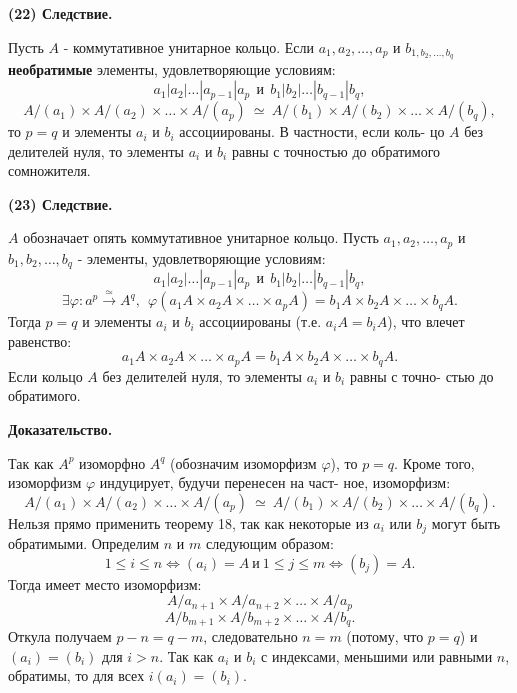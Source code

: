 \documentclass{mai_book}
\begin{document}
	{\bf (22) Следствие.}
	
	Пусть $A$ - коммутативное унитарное кольцо. Если $a_{1}, a_{2}, \ldots, a_{p}$ и\linebreak
	$b_{1, b_{2}, \ldots, b_{q}}$ {\bf необратимые} элементы, удовлетворяющие условиям:
	$$a_{1} |a_{2}|\ldots |a_{p - 1}|a_{p} \ \ \text{и} \ \ b_{1} |b_{2}|\ldots |b_{q - 1}|b_{q},$$
	$$A/(a_{1}) \times A/(a_{2}) \times \ldots \times A/(a_{p}) \ \simeq \ A/(b_{1}) \times A/(b_{2}) \times \ldots \times A/(b_{q}),$$
	то $p = q$ и элементы $a_{i}$ и $b_{i}$ ассоциированы. В частности, если коль-\linebreak
	цо $A$ без делителей нуля, то элементы $a_{i}$ и $b_{i}$ равны с точностью до\linebreak
	обратимого сомножителя.
	
	{\bf (23) Следствие.}
	
	$A$ обозначает опять коммутативное унитарное кольцо. Пусть\linebreak
	$a_{1}, a_{2}, \ldots, a_{p}$ и $b_{1}, b_{2}, \ldots, b_{q}$ - элементы, удовлетворяющие условиям:\linebreak
	$$a_{1} |a_{2}|\ldots |a_{p - 1}|a_{p} \ \ \text{и} \ \ b_{1} |b_{2}|\ldots |b_{q - 1}|b_{q},$$
	$$\exists \varphi : a^{p} \xrightarrow{\simeq} A^{q}, \ \ \varphi (a_{1}A \times a_{2}A \times \ldots \times a_{p}A) = b_{1}A \times b_{2}A \times \ldots \times b_{q}A.$$
	Тогда $p = q$ и элементы $a_{i}$ и $b_{i}$ ассоциированы (т.е. $a_{i}A = b_{i}A$), что\linebreak
	влечет равенство:
	$$a_{1}A \times a_{2}A \times \ldots \times a_{p}A = b_{1}A \times b_{2}A \times \ldots \times b_{q}A.$$
	Если кольцо $A$ без делителей нуля, то элементы $a_{i}$ и $b_{i}$ равны с точно-\linebreak
	стью до обратимого.
	\pagebreak
	
	{\bf Доказательство.}
	
	Так как $A^{p}$ изоморфно $A^{q}$ (обозначим изоморфизм $\varphi$), то $p = q$.\linebreak
	Кроме того, изоморфизм $\varphi$ индуцирует, будучи перенесен на част-\linebreak
	ное, изоморфизм:
	$$A/(a_{1}) \times A/(a_{2}) \times \ldots \times A/(a_{p}) \ \simeq \ A/(b_{1}) \times A/(b_{2}) \times \ldots \times A/(b_{q}).$$
	Нельзя прямо применить теорему 18, так как некоторые из $a_{i}$ или\linebreak
	$b_{j}$ могут быть обратимыми. Определим $n$ и $m$ следующим образом:
	$$1 \leqslant i \leqslant n \Longleftrightarrow  (a_{i}) = A \ \text{и} \ 1 \leqslant j \leqslant m \Longleftrightarrow  (b_{j}) = A.$$
	Тогда имеет место изоморфизм:
	$$A/a_{n + 1} \times A/a_{n + 2} \times \ldots \times A/a_{p}$$
	$$A/b_{m + 1} \times A/b_{m + 2} \times \ldots \times A/b_{q}.$$
	Откула получаем $p - n = q - m$, следовательно $n = m$ (потому, что\linebreak
	$p = q$) и $(a_{i}) = (b_{i})$ для $i > n$. Так как $a_{i}$ и $b_{i}$ с индексами, меньшими\linebreak
	или равными $n$, обратимы, то для всех $i (a_{i}) = (b_{i})$.
	
\end{document}
